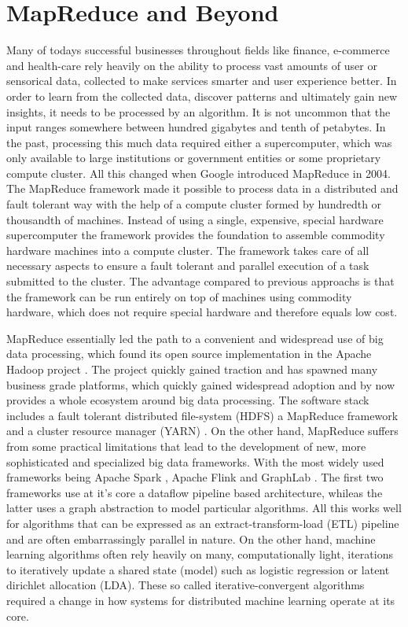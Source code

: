 \section{MapReduce and Beyond}
Many of todays successful businesses throughout fields like finance, e-commerce and health-care rely heavily on the ability to process vast amounts of user or sensorical data, collected to make services smarter and user experience better.
In order to learn from the collected data, discover patterns and ultimately gain new insights, it needs to be processed by an algorithm.
It is not uncommon that the input ranges somewhere between hundred gigabytes and tenth of petabytes.
In the past, processing this much data required either a supercomputer, which was only available to large institutions or government entities or some proprietary compute cluster.
All this changed when Google introduced MapReduce \cite{Dean2004} in 2004.
The MapReduce framework made it possible to process data in a distributed and fault tolerant way with the help of a compute cluster formed by hundredth or thousandth of machines.
Instead of using a single, expensive, special hardware supercomputer the framework provides the foundation to assemble commodity hardware machines into a compute cluster.
The framework takes care of all necessary aspects to ensure a fault tolerant and parallel execution of a task submitted to the cluster.
The advantage compared to previous approachs is that the framework can be run entirely on top of machines using commodity hardware, which does not require special hardware and therefore equals low cost.

MapReduce essentially led the path to a convenient and widespread use of big data processing, which found its open source implementation in the Apache Hadoop project \cite{hadoop2009hadoop}.
The project quickly gained traction and has spawned many business grade platforms, which quickly gained widespread adoption and by now provides a whole ecosystem around big data processing. The software stack includes a fault tolerant distributed file-system (HDFS) a MapReduce framework and a cluster resource manager (YARN) \cite{KumarVavilapalli2013}.
On the other hand, MapReduce suffers from some practical limitations that lead to the development of new, more sophisticated and specialized big data frameworks. With the most widely used frameworks being Apache Spark \cite{Zaharia2010}, Apache Flink \cite{Alexandrov2014} and GraphLab \cite{Low2012}.
The first two frameworks use at it's core a dataflow pipeline based architecture, whileas the latter uses a graph abstraction to model particular algorithms.
All this works well for algorithms that can be expressed as an extract-transform-load (ETL) pipeline and are often embarrassingly parallel in nature.
On the other hand, machine learning algorithms often rely heavily on many, computationally light, iterations to iteratively update a shared state (model) such as logistic regression or latent dirichlet allocation (LDA).
These so called iterative-convergent algorithms required a change in how systems for distributed machine learning operate at its core.


